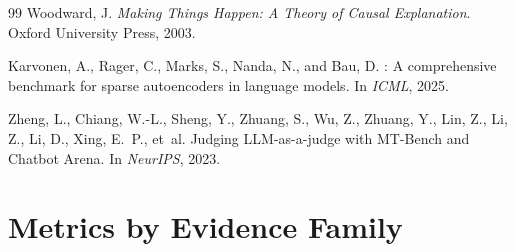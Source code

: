 \documentclass[10pt]{article}
\begin{document}
\begin{thebibliography}{99}
Woodward, J.
\newblock \emph{Making Things Happen: A Theory of Causal Explanation}.
\newblock Oxford University Press, 2003.

Karvonen, A., Rager, C., Marks, S., Nanda, N., and Bau, D.
: A comprehensive benchmark for sparse autoencoders in language models.
\newblock In \emph{ICML}, 2025.

Zheng, L., Chiang, W.-L., Sheng, Y., Zhuang, S., Wu, Z., Zhuang, Y., Lin, Z., Li, Z., Li, D., Xing, E.~P., et~al.
\newblock Judging {LLM}-as-a-judge with {MT}-Bench and Chatbot Arena.
\newblock In \emph{NeurIPS}, 2023.

\end{thebibliography}

\appendix

\section{Metrics by Evidence Family}
\label{app:metrics}
\end{document}
